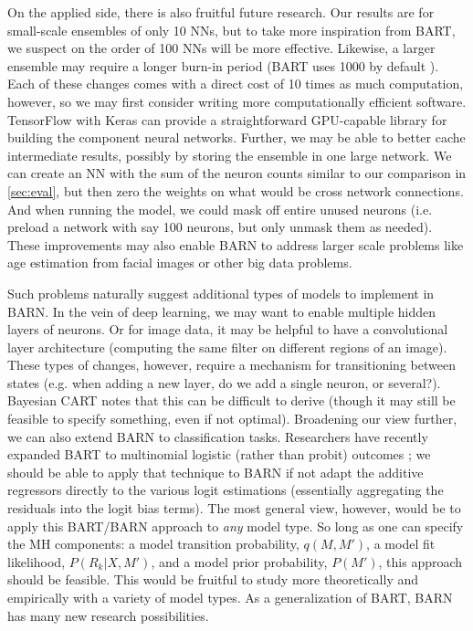 \documentclass[12pt]{article}
\begin{document}
On the applied side, there is also fruitful future research.  Our results are for small-scale ensembles of only 10 NNs, but to take more inspiration from BART, we suspect on the order of 100 NNs will be more effective.  Likewise, a larger ensemble may require a longer burn-in period (BART uses 1000 by default \cite{chipman2010bart}).  Each of these changes comes with a direct cost of 10 times as much computation, however, so we may first consider writing more computationally efficient software.  TensorFlow with Keras \cite{chollet2015keras} can provide a straightforward GPU-capable library for building the component neural networks.  Further, we may be able to better cache intermediate results, possibly by storing the ensemble in one large network.  We can create an NN with the sum of the neuron counts similar to our comparison in \autoref{sec:eval}, but then zero the weights on what would be cross network connections.  And when running the model, we could mask off entire unused neurons (i.e. preload a network with say 100 neurons, but only unmask them as needed).  These improvements may also enable BARN to address larger scale problems like age estimation from facial images or other big data problems.

Such problems naturally suggest additional types of models to implement in BARN.  In the vein of deep learning, we may want to enable multiple hidden layers of neurons.  Or for image data, it may be helpful to have a convolutional layer architecture (computing the same filter on different regions of an image).  These types of changes, however, require a mechanism for transitioning between states (e.g. when adding a new layer, do we add a single neuron, or several?).  Bayesian CART \cite{chipman1998bayesian} notes that this can be difficult to derive (though it may still be feasible to specify something, even if not optimal).  Broadening our view further, we can also extend BARN to classification tasks.  Researchers have recently expanded BART to multinomial logistic (rather than probit) outcomes \cite{xu2021inference}; we should be able to apply that technique to BARN if not adapt the additive regressors directly to the various logit estimations (essentially aggregating the residuals into the logit bias terms).  The most general view, however, would be to apply this BART/BARN approach to \emph{any} model type.  So long as one can specify the MH components: a model transition probability, $q(M,M')$, a model fit likelihood, $P(R_k|X, M')$, and a model prior probability, $P(M')$, this approach should be feasible.  This would be fruitful to study more theoretically and empirically with a variety of model types.  As a generalization of BART, BARN has many new research possibilities.
\end{document}
